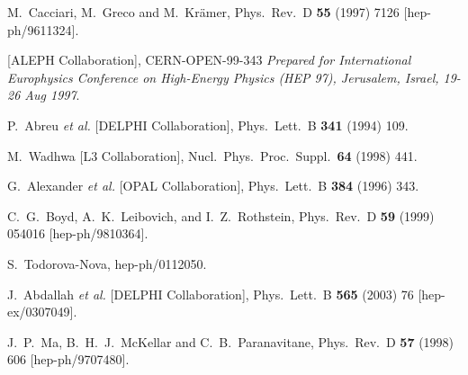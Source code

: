 \begin{thebibliography}{999}
M.~Cacciari, M.~Greco and M.~Kr\"amer,
Phys.\ Rev.\ D {\bf 55} (1997) 7126
[hep-ph/9611324].



  [ALEPH Collaboration],
CERN-OPEN-99-343
{\it Prepared for International Europhysics Conference 
on High-Energy Physics (HEP 97), Jerusalem, Israel, 19-26 Aug 1997}.

P.~Abreu {\it et al.}  [DELPHI Collaboration],
Phys.\ Lett.\ B {\bf 341} (1994) 109.

M.~Wadhwa  [L3 Collaboration],
Nucl.\ Phys.\ Proc.\ Suppl.\  {\bf 64} (1998) 441.

G.~Alexander {\it et al.}  [OPAL Collaboration],
Phys.\ Lett.\ B {\bf 384} (1996) 343.

C.~G.~Boyd, A.~K.~Leibovich, and I.~Z.~Rothstein,
Phys.\ Rev.\ D {\bf 59} (1999) 054016
[hep-ph/9810364].

S.~Todorova-Nova,
hep-ph/0112050.

J.~Abdallah {\it et al.}  [DELPHI Collaboration],
Phys.\ Lett.\ B {\bf 565} (2003) 76
[hep-ex/0307049].

J.~P.~Ma, B.~H.~J.~McKellar and C.~B.~Paranavitane,
Phys.\ Rev.\ D {\bf 57} (1998) 606
[hep-ph/9707480].


\end{thebibliography}
